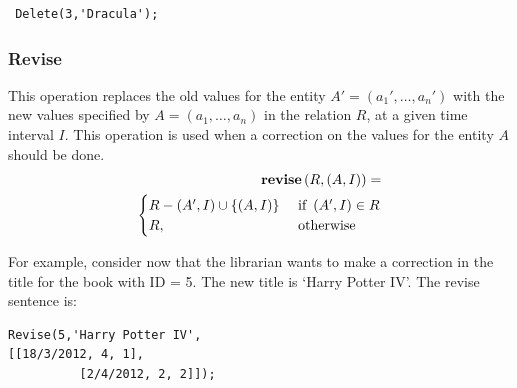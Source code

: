 \begin{verbatim}
 Delete(3,'Dracula');
\end{verbatim}


\subsubsection{\label{subsubsec:revise-fuzzy-temporal}Revise}
This operation replaces the old values for the entity $A'= \left(a_1', \ldots, a_n' \right) $ with the new values specified by $A = \left(a_1, \ldots, a_n \right)$ in the relation $R$, at a given time interval $I$. This operation is used when a correction on the values for the entity $A$ should be done.
\begin{align}
\label{eq:revise-fuzzy-temporal}
\REV\left(R, \left(A, I \right)\right)=\\
\begin{cases}
\nonumber
 R - \left(A', I \right) \cup \left \lbrace\left(A, I \right)\right \rbrace  & \mbox{ if } \left(A', I \right) \in R \\%
R, & \mbox{ otherwise }
\end{cases}
\end{align} 


For example, consider now that the librarian wants to make a correction in the title for the book with ID = 5. The new title is `Harry Potter IV'. The revise sentence is:

\begin{verbatim}
Revise(5,'Harry Potter IV', 
[[18/3/2012, 4, 1], 
          [2/4/2012, 2, 2]]);
\end{verbatim}
